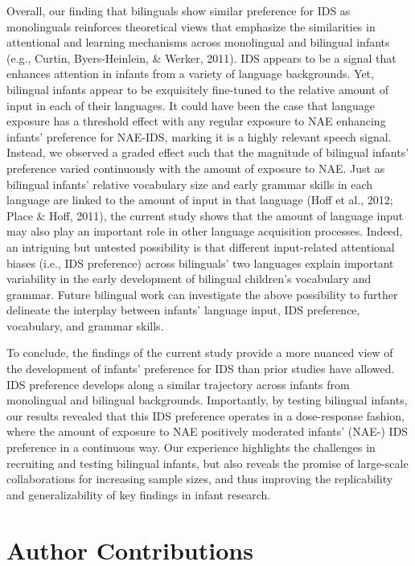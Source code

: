 \documentclass[,man,floatsintext]{apa6}
\begin{document}
Overall, our finding that bilinguals show similar preference for IDS as monolinguals reinforces theoretical views that emphasize the similarities in attentional and learning mechanisms across monolingual and bilingual infants (e.g., Curtin, Byers-Heinlein, \& Werker, 2011). IDS appears to be a signal that enhances attention in infants from a variety of language backgrounds. Yet, bilingual infants appear to be exquisitely fine-tuned to the relative amount of input in each of their languages. It could have been the case that language exposure has a threshold effect with any regular exposure to NAE enhancing infants' preference for NAE-IDS, marking it is a highly relevant speech signal. Instead, we observed a graded effect such that the magnitude of bilingual infants' preference varied continuously with the amount of exposure to NAE. Just as bilingual infants' relative vocabulary size and early grammar skills in each language are linked to the amount of input in that language (Hoff et al., 2012; Place \& Hoff, 2011), the current study shows that the amount of language input may also play an important role in other language acquisition processes. Indeed, an intriguing but untested possibility is that different input-related attentional biases (i.e., IDS preference) across bilinguals' two languages explain important variability in the early development of bilingual children's vocabulary and grammar. Future bilingual work can investigate the above possibility to further delineate the interplay between infants' language input, IDS preference, vocabulary, and grammar skills.

To conclude, the findings of the current study provide a more nuanced view of the development of infants' preference for IDS than prior studies have allowed. IDS preference develops along a similar trajectory across infants from monolingual and bilingual backgrounds. Importantly, by testing bilingual infants, our results revealed that this IDS preference operates in a dose-response fashion, where the amount of exposure to NAE positively moderated infants' (NAE-) IDS preference in a continuous way. Our experience highlights the challenges in recruiting and testing bilingual infants, but also reveals the promise of large-scale collaborations for increasing sample sizes, and thus improving the replicability and generalizability of key findings in infant research.

\hypertarget{author-contributions}{%
\section{Author Contributions}\label{author-contributions}}
\end{document}

